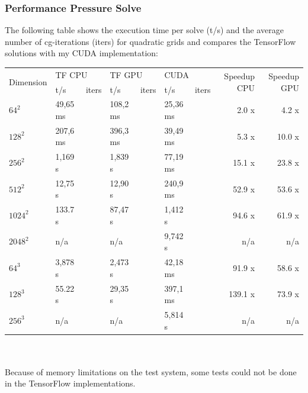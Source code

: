 \subsubsection{Performance Pressure Solve}
The following table shows the execution time per solve (t/s) and the average number of cg-iterations (iters) for quadratic grids and compares the TensorFlow solutions with my CUDA implementation: \\
\renewcommand{\arraystretch}{1.39}
\footnotesize
\begin{tabular}{l||l|l|l|l|l|l||r|r}
\hline
\multirow{2}{*}{Dimension} & \multicolumn{2}{l|}{TF CPU} & \multicolumn{2}{l|}{TF GPU} & \multicolumn{2}{l||}{CUDA} & \multirow{2}{*}{Speedup CPU} & \multirow{2}{*}{Speedup GPU} \\ \cline{2-7} 
                  & t/s        & iters        & t/s        & iters        & t/s         & iters        &             &             \\ \hline
$64^2$   & 49,65 ms &  & 108,2 ms &  & 25,36 ms &  & 2.0 x   & 4.2 x  \\ \hline
$128^2$  & 207,6 ms &  & 396,3 ms &  & 39,49 ms &  & 5.3 x   & 10.0 x \\ \hline
$256^2$  & 1,169 s  &   & 1,839 s &  & 77,19 ms &  & 15.1 x  & 23.8 x \\ \hline
$512^2$  & 12,75 s  &   & 12,90 s &  & 240,9 ms &  & 52.9 x  & 53.6 x \\ \hline
$1024^2$ & 133.7 s  &   & 87,47 s &  & 1,412 s  &  & 94.6 x  & 61.9 x \\ \hline
$2048^2$ & n/a      &   & n/a     &  & 9,742 s  &  & n/a     & n/a    \\ \hline \hline

$64^3$   & 3,878 s  &  & 2,473 s  &  & 42,18 ms &  & 91.9 x  & 58.6 x \\ \hline
$128^3$  & 55.22 s  &  & 29,35 s  &  & 397,1 ms &  & 139.1 x & 73.9 x \\ \hline
$256^3$  & n/a      &  & n/a      &  & 5,814 s  &  & n/a  & n/a 		  \\ \hline
\end{tabular}\\\\
\normalsize
Because of memory limitations on the test system, some tests could not be done in the TensorFlow implementations.

